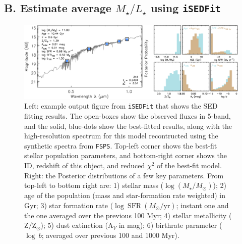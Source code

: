 \documentclass{emulateapj}
\def\logms{{$\log (M_{\star}/M_{\odot})$}}
\begin{document}
\begin{CJK*}{UTF8}{gbsn}

\section{B. Estimate average {$M_{\star}/L_{\star}$} using \texttt{iSEDFit}} 
    \label{app:B}

    \begin{figure}[bt!]
        \begin{center}
        \includegraphics[width=\textwidth]{fig/redbcg_isedfit_example.pdf}
        \caption{Left: example output figure from \texttt{iSEDFit} that shows the SED 
        	fitting results. 
            The open-boxes show the observed fluxes in 5-band, and the solid, blue-dots
            show the best-fitted results, along with the high-resolution spectrum for
            this model recontructed using the synthetic spectra from \texttt{FSPS}. 
            Top-left corner shows the best-fit stellar population parameters, and 
            bottom-right corner shows the ID, redshift of this object, and reduced 
            $\chi^2$ of the best-fit model.~~~
            Right: the Posterior distributions of a few key parameters.
            From top-left to bottom right are: 1) stellar mass (\logms{}); 2) age of the 
            population (mass and star-formation rate weighted) in Gyr; 3) star formation 
            rate ($\log\ \mathrm{SFR}\ (M_{\odot}/\mathrm{yr})$; instant one and the one 
            averaged over the previous 100 Myr; 4) stellar metallicity 
            ($\mathrm{Z}/\mathrm{Z}_{\odot}$); 5) dust extinction ($\mathrm{A}_V$ in mag);
            6) birthrate parameter ($\log\ b$; averaged over previous 100 and 1000 Myr).}
        \label{fig:ised}
        \end{center}
    \end{figure}


\end{CJK*}
\end{document}
